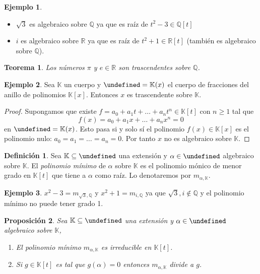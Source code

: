 \documentclass[10pt, spanish]{report}
\newtheorem{tma}{Teorema}[chapter]
\newtheorem{prop}[tma]{Proposición}
\theoremstyle{definition}
\newtheorem*{defin}{Definición}
\newtheorem*{ej}{Ejemplo}
\newcommand{\Q}{\mathbb{Q}}
\newcommand{\R}{\mathbb{R}}
\newcommand{\K}{\mathbb{K}}
\let\L\undefined
\newcommand{\L}{\mathbb{L}}
\renewcommand{\geq}{\geqslant}
\begin{document}
\begin{ej}\hspace{0pt}
    \begin{itemize}
        \item $\sqrt{3}$ es algebraico sobre $\Q$ ya que es raíz de $t^2-3\in\Q[t]$
        \item $i$ es algebraico sobre $\R$ ya que es raíz de $t^2+1\in \R[t]$
            (también es algebraico sobre $\Q$).
    \end{itemize}
\end{ej}

\begin{tma}
    Los números $\pi$ y $e\in\R$ son trascendentes sobre $\Q$.
\end{tma}

\begin{ej}
    Sea $\K$ un cuerpo y $\L=\K(x)$ el cuerpo de fracciones del anillo de
    polinomios $\K[x]$. Entonces $x$ es trascendente sobre $\K$.
\end{ej}

\begin{proof}
    Supongamos que existe $f=a_0+a_1t+\ldots+a_nt^n\in\K[t]$ con $n\geq1$ tal
    que \[f(x)=a_0+a_1x+\ldots+a_nx^n=0\] en $\L=\K(x)$. Esto pasa si y solo sí el
    polinomio $f(x)\in\K[x]$ es el polinomio nulo: $a_0=a_1=\ldots=a_n=0$. Por
    tanto $x$ no es algebraico sobre $\K$.
\end{proof}

\begin{defin}
    Sea $\K\subseteq\L$ una extensión y $\alpha\in\L$ algebraico sobre $\K$. El
    \textit{polinomio mínimo} de $\alpha$ sobre $\K$ es el polinomio mónico de
    menor grado en $\K[t]$ que tiene a $\alpha$ como raíz. Lo denotaremos por
    $m_{\alpha,\K}$.
\end{defin}

\begin{ej}
    $x^2-3=m_{\sqrt{3},\Q}$ y $x^2+1=m_{i,\Q}$ ya que $\sqrt{3},i\not\in\Q$ y el
    polinomio mínimo no puede tener grado 1.
\end{ej}

\begin{prop}\label{prop:pminirred}
    Sea $\K\subseteq\L$ una extensión y $\alpha\in \L$ algebraico sobre $\K$,
    \begin{enumerate}
        \item El polinomio mínimo $m_{\alpha,\K}$ es irreducible en $\K[t]$.
        \item Si $g\in \K[t]$ es tal que $g(\alpha)=0$ entonces $m_{\alpha,\K}$
            divide a $g$.
    \end{enumerate}
\end{prop}
\end{document}
